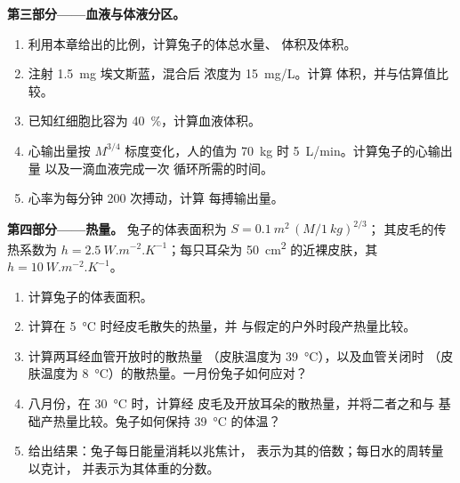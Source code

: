 \begin{problem}
\medskip
\noindent\textbf{第三部分——血液与体液分区。}
\begin{enumerate}[resume]
  \item 利用本章给出的比例，计算兔子的体总水量、
        体积及体积。
  \item 注射 \qty{1.5}{mg} 埃文斯蓝，混合后
        浓度为 \qty{15}{mg/L}。计算
        体积，并与估算值比较。
  \item 已知红细胞比容为 \qty{40}{\%}，计算血液体积。
  \item 心输出量按 $M^{3/4}$ 标度变化，人的值为
        \qty{70}{kg} 时 \qty{5}{L/min}。计算兔子的心输出量
        以及一滴血液完成一次
        循环所需的时间。
  \item 心率为每分钟 \qty{200}{} 次搏动，计算
        每搏输出量。
\end{enumerate}

\medskip
\noindent\textbf{第四部分——热量。}
兔子的体表面积为 $S = \qty{0.1}{m^2}\,(M/\qty{1}{kg})^{2/3}$；
其皮毛的传热系数为 $h = \qty{2.5}{W.m^{-2}.K^{-1}}$；每只耳朵为
\qty{50}{cm^2} 的近裸皮肤，其 $h = \qty{10}{W.m^{-2}.K^{-1}}$。
\begin{enumerate}[resume]
  \item 计算兔子的体表面积。
  \item 计算在 \qty{5}{\celsius} 时经皮毛散失的热量，并
        与假定的户外时段产热量比较。
  \item 计算两耳经血管开放时的散热量
        （皮肤温度为 \qty{39}{\celsius}），以及血管关闭时
        （皮肤温度为 \qty{8}{\celsius}）的散热量。一月份兔子如何应对？
  \item 八月份，在 \qty{30}{\celsius} 时，计算经
        皮毛及开放耳朵的散热量，并将二者之和与
        基础产热量比较。兔子如何保持
        \qty{39}{\celsius} 的体温？
  \item 给出结果：兔子每日能量消耗以兆焦计，
        表示为其的倍数；每日水的周转量以克计，
        并表示为其体重的分数。
\end{enumerate}
\end{problem}
